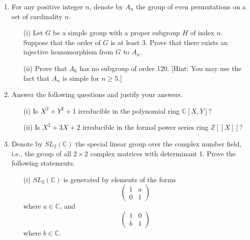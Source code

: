 \documentclass{article}
\begin{document}
\maketitle






\begin{enumerate}
    \item For any positive integer \( n \), denote by \( A_n \) the group of even permutations on a set of cardinality \( n \).

    \begin{enumerate}
        \item[(i)] Let \( G \) be a simple group with a proper subgroup \( H \) of index \( n \). Suppose that the order of \( G \) is at least 3. Prove that there exists an injective homomorphism from \( G \) to \( A_n \).
        
        \item[(ii)] Prove that \( A_6 \) has no subgroup of order 120. [Hint: You may use the fact that \( A_n \) is simple for \( n \geq 5 \).]
    \end{enumerate}
    \item Answer the following questions and justify your answers.

    \begin{enumerate}
        \item[(i)] Is \( X^2 + Y^2 + 1 \) irreducible in the polynomial ring \( \mathbb{C}[X, Y] \)?
        
        \item[(ii)] Is \( X^2 + 3X + 2 \) irreducible in the formal power series ring \( \mathbb{Z}[[X]] \)?
    \end{enumerate}
    \item Denote by \( SL_2(\mathbb{C}) \) the special linear group over the complex number field, i.e., the group of all \( 2 \times 2 \) complex matrices with determinant 1. Prove the following statements.

    \begin{enumerate}
        \item[(i)] \( SL_2(\mathbb{C}) \) is generated by elements of the forms
        \[
        \begin{pmatrix}
        1 & a \\
        0 & 1 
        \end{pmatrix}
        \]
        where \( a \in \mathbb{C} \), and
        \[
        \begin{pmatrix}
        1 & 0 \\
        b & 1 
        \end{pmatrix}
        \]
        where \( b \in \mathbb{C} \).
        

\end{enumerate}
\end{enumerate}
\end{document}
